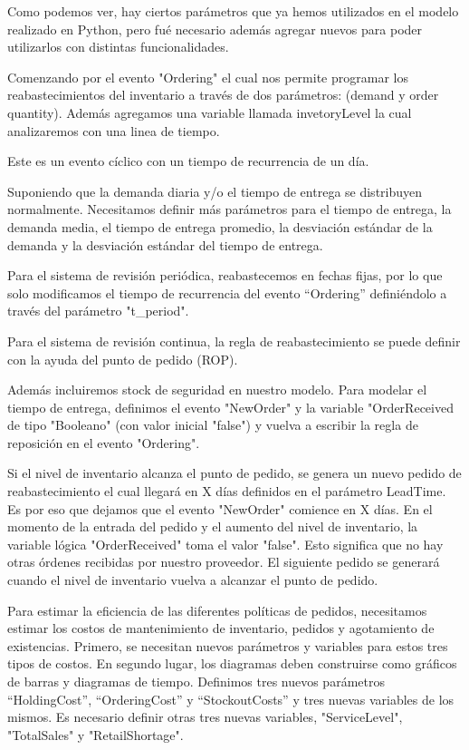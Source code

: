     Como podemos ver, hay ciertos parámetros que ya hemos utilizados en el modelo realizado en Python, pero fué necesario además agregar nuevos para poder utilizarlos con distintas funcionalidades.

    Comenzando por el evento "Ordering" el cual nos permite programar los reabastecimientos del inventario a través de dos parámetros: (demand y order quantity). Además agregamos una variable llamada invetoryLevel la cual analizaremos con una linea de tiempo.

    Este es un evento cíclico con un tiempo de recurrencia de un día.

    Suponiendo que la demanda diaria y/o el tiempo de entrega se distribuyen normalmente.
    Necesitamos definir más  parámetros para el tiempo de entrega, la demanda media, el tiempo de entrega promedio, la desviación estándar de la demanda y la desviación estándar del tiempo de entrega.

    Para el sistema de revisión periódica, reabastecemos en fechas fijas, por lo que solo modificamos el tiempo de recurrencia del evento “Ordering” definiéndolo a través del parámetro "t\_period".

    Para el sistema de revisión continua, la regla de reabastecimiento se puede definir con la ayuda del punto de pedido (ROP).

    Además incluiremos stock de seguridad en nuestro modelo.
    Para modelar el tiempo de entrega, definimos el evento "NewOrder" y la variable "OrderReceived de tipo "Booleano" (con valor inicial "false") y vuelva a escribir la regla de reposición en el evento "Ordering".

    Si el nivel de inventario alcanza el punto de pedido, se genera un nuevo pedido de reabastecimiento el cual llegará en X días definidos en el parámetro LeadTime.
    Es por eso que dejamos que el evento "NewOrder" comience en X días.
    En el momento de la entrada del pedido y el aumento del nivel de inventario, la variable lógica "OrderReceived" toma el valor "false". Esto significa que no hay otras órdenes
    recibidas por nuestro proveedor.
    El siguiente pedido se generará cuando el nivel de inventario vuelva a alcanzar el punto de pedido.

    Para estimar la eficiencia de las diferentes políticas de pedidos, necesitamos estimar los costos de mantenimiento de inventario, pedidos y agotamiento de existencias.
    Primero, se necesitan nuevos parámetros y variables para estos tres tipos de costos. En segundo lugar, los diagramas deben construirse como gráficos de barras y diagramas de tiempo.
    Definimos tres nuevos parámetros “HoldingCost”, “OrderingCost” y “StockoutCosts” y tres nuevas variables de los mismos. Es necesario definir otras tres nuevas variables, "ServiceLevel", "TotalSales" y "RetailShortage".

